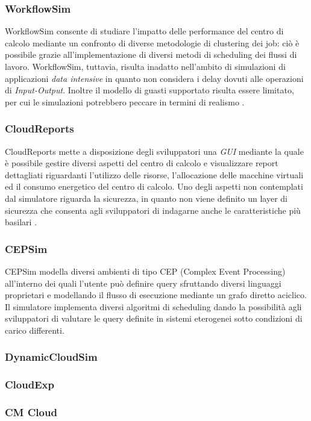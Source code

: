 {\subsubsection*{WorkflowSim}
WorkflowSim \cite{chen2012workflowsim} consente di studiare l'impatto delle performance del centro di calcolo mediante un confronto di diverse metodologie di clustering dei job: ciò è possibile grazie all'implementazione di diversi metodi di scheduling dei flussi di lavoro. WorkflowSim, tuttavia, risulta inadatto nell'ambito di simulazioni di applicazioni \emph{data intensive} in quanto non considera i delay dovuti alle operazioni di \emph{Input-Output}. Inoltre il modello di guasti supportato risulta essere limitato, per cui le simulazioni potrebbero peccare in termini di realismo \cite{mansouri2020cloud}. 
\subsubsection*{CloudReports}
CloudReports \cite{teixeira2014cloudreports} mette a disposizione degli sviluppatori una \emph{GUI} mediante la quale è possibile gestire diversi aspetti del centro di calcolo e visualizzare report dettagliati riguardanti l'utilizzo delle risorse, l'allocazione delle macchine virtuali ed il consumo energetico del centro di calcolo. Uno degli aspetti non contemplati dal simulatore riguarda la sicurezza, in quanto non viene definito un layer di sicurezza che consenta agli sviluppatori di indagarne anche le caratteristiche più basilari \cite{mansouri2020cloud}.
\subsubsection*{CEPSim}
CEPSim \cite{higashino2015cepsim} modella diversi ambienti di tipo CEP (Complex Event Processing) \cite{luckham1998complex} all'interno dei quali l'utente può definire query sfruttando diversi linguaggi proprietari e modellando il flusso di esecuzione mediante un grafo diretto aciclico. Il simulatore implementa diversi algoritmi di scheduling dando la possibilità agli sviluppatori di valutare le query definite in sistemi eterogenei sotto condizioni di carico differenti. 
\subsubsection*{DynamicCloudSim}
\subsubsection*{CloudExp}
\subsubsection*{CM Cloud}
}
